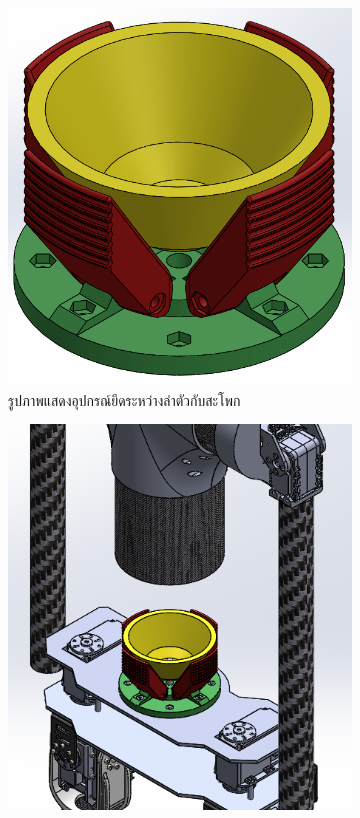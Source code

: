 \clearpage
\begin{figure}[h!]
  \centering
  \begin{subfigure}[b]{0.4\linewidth}
    \includegraphics[width=\linewidth]{chapter4/images/hipconnector.PNG}
    \caption{รูปภาพแสดงอุปกรณ์ยึดระหว่างลำตัวกับสะโพก}
  \end{subfigure}
  \begin{subfigure}[b]{0.4\linewidth}
    \includegraphics[width=\linewidth]{chapter4/images/explode_hipconnect.PNG}

\end{subfigure}
\end{figure}
